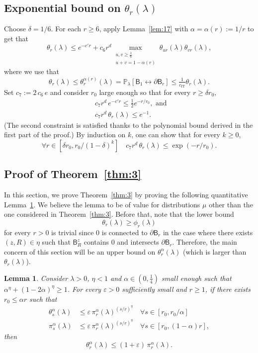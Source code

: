 \documentclass[10pt]{amsart}
\newtheorem{lemm}[theo]{Lemma}\newtheorem{prop}[theo]{Proposition}\newtheorem{coro}[theo]{Corollary}\newtheorem{conj}[theo]{Conjecture}
\theoremstyle{definition}\newtheorem{defi}[theo]{Definition}\newtheorem{rema}[theo]{Remark}\newtheorem{exam}[theo]{Example}\newtheorem{exem}[theo]{Example}\newtheorem{nota}[theo]{Notation}
\newcommand{\ep}{\varepsilon}
\DeclareMathOperator{\IT}{IT}
\let\oldforall\forall
\renewcommand*{\forall}{\mathrel{\oldforall}}
\begin{document}
\subsection{Exponential bound on $\theta_r(\lambda)$}
Choose $\delta=1/6$. For each $r\ge6$, apply Lemma~\ref{lem:17} with $\alpha=\alpha(r):=1/r$ to get that
\[
\theta_r(\lambda)\le e^{-c'r}+c_6r^d \max_{\substack{u,v\ge\tfrac16 \\ u+v=1-\alpha(r)}}\theta_{ur}(\lambda)\theta_{vr}(\lambda),
\]
where we use that
\[
\theta_r(\lambda)\le \theta_r^{\alpha(r)}(\lambda)={\mathbb P}_\lambda[\mathsf B_1\longleftrightarrow\partial\mathsf B_r]\le \tfrac1{c_{\IT}}\theta_r(\lambda).
\]
Set $c_7:=2 \, c_6 \, e $ and consider $r_0$ large enough so that for every $r\ge \delta r_0$,
\begin{align*}
&c_7r^d\,e^{-c'r}\le \tfrac12e^{-r/r_0},\text{ and }\\
&c_7r^d\,\theta_r(\lambda)\le e^{-1}.
\end{align*}
(The second constraint is satisfied thanks to the polynomial bound derived in the first part of the proof.) By induction on $k$, one can show that for every $k\ge 0$,
\[
\forall r\in[\delta r_0, r_0/(1-\delta)^k]\quad c_7r^d\,\theta_r(\lambda)\le \exp(-r/r_0).
\]

\subsection{Proof of Theorem~\ref{thm:3}}\label{sec:4.3}

In this section, we prove Theorem~\ref{thm:3} by proving the following quantitative Lemma~\ref{thm:16}. We believe the lemma to be of value for distributions $\mu$ other than the one considered in Theorem~\ref{thm:3}. Before that, note that the lower bound
\begin{equation}
\theta_r(\lambda)\ge \phi_r(\lambda)\label{eq:m1}
\end{equation}
for every $r>0$ is trivial since 0 is connected to $\partial\mathsf B_r$ in the case where there exists $(z,R)\in \eta$ such that $\mathsf B_R^z$ contains 0 and intersects $\partial\mathsf B_r$. Therefore, the main concern of this section will be an upper bound on $\theta_r^\alpha(\lambda)$ (which is larger than $\theta_r(\lambda)$).

\begin{lemm}\label{thm:16}
Consider $\lambda>0$, $\eta<1$ and $\alpha\in(0,\tfrac14)$ small enough such that $\alpha^{\eta}+(1-2\alpha)^{\eta}\ge 1$. For every $\ep>0$ sufficiently small and $r\ge1$, if there exists $r_0\le \alpha r$ such that
\begin{align}
\theta_s^\alpha(\lambda)&\le \ep\, \pi_{r}^\alpha(\lambda)^{(s/r)^\eta}\quad\forall s\in[r_0,r_0/\alpha]\label{eq:f1}
\\
\pi_s^\alpha(\lambda)&\le \ep\,\pi_r^\alpha(\lambda)^{(s/r)^\eta}\quad\forall s\in[r_0,(1-\alpha)r],\label{eq:f2}
\end{align}
then
\begin{equation}
\theta_{r}^\alpha(\lambda)\le (1+\ep)\,\pi_{r}^\alpha(\lambda).
\end{equation}
\end{lemm}
\end{document}
